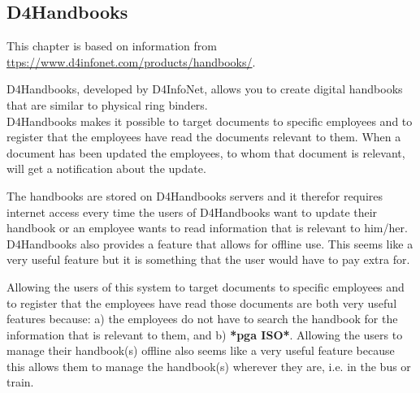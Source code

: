 \subsection{D4Handbooks}
This chapter is based on information 
from \url{ttps://www.d4infonet.com/products/handbooks/}.

D4Handbooks, developed by D4InfoNet, allows you to create digital handbooks that are similar to physical ring binders.\\
D4Handbooks makes it possible to target documents to specific employees and to register that the employees have read the documents relevant to them. When a document has been updated the employees, to whom that document is relevant, will get a notification about the update.

The handbooks are stored on D4Handbooks servers and it therefor requires internet access every time the users of D4Handbooks want to update their handbook or an employee wants to read information that is relevant to him/her.\\
D4Handbooks also provides a feature that allows for offline use. This seems like a very useful feature but it is something that the user would have to pay extra for.

Allowing the users of this system to target documents to specific employees and to register that the employees have read those documents are both very useful features because: a) the employees do not have to search the handbook for the information that is relevant to them, and b) \textbf{*pga ISO*}. Allowing the users to manage their handbook(s) offline also seems like a very useful feature because this allows them to manage the handbook(s) wherever they are, i.e. in the bus or train. 
